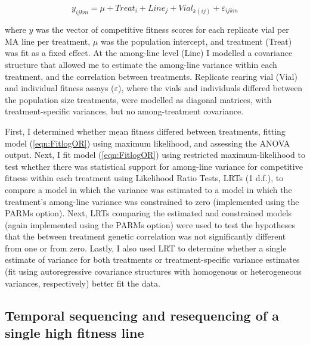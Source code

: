 \begin{equation}
\label{eqn:FitlogOR}
y_{ijkm}=\mu + Treat_i + Line_j + Vial_{k(ij)} + \varepsilon_{ijkm}
\end{equation}

\noindent where $y$ was the vector of competitive fitness scores for each replicate vial per MA line per treatment, $\mu$ was the population intercept, and treatment (Treat) was fit as a fixed effect. At the among-line level (Line) I modelled a covariance structure that allowed me to estimate the among-line variance within each treatment, and the correlation between treatments. Replicate rearing vial (Vial) and individual fitness assays ($\varepsilon$), where the vials and individuals differed between the population size treatments, were modelled as diagonal matrices, with treatment-specific variances, but no among-treatment covariance. \par

First, I determined whether mean fitness differed between treatments, fitting model (\ref{eqn:FitlogOR}) using maximum likelihood, and assessing the ANOVA output. Next, I fit model (\ref{eqn:FitlogOR}) using restricted maximum-likelihood to test whether there was statistical support for among-line variance for competitive fitness within each treatment using Likelihood Ratio Tests, LRTs (1 d.f.), to compare a model in which the variance was estimated to a model in which the treatment’s among-line variance was constrained to zero (implemented using the PARMs option). Next, LRTs comparing the estimated and constrained models (again implemented using the PARMs option) were used to test the hypotheses that the between treatment genetic correlation was not significantly different from one or from zero. Lastly, I also used LRT to determine whether a single estimate of variance for both treatments or treatment-specific variance estimates (fit using autoregressive covariance structures with homogenous or heterogeneous variances, respectively) better fit the data. \par

\subsection{Temporal sequencing and resequencing of a single high fitness line}
